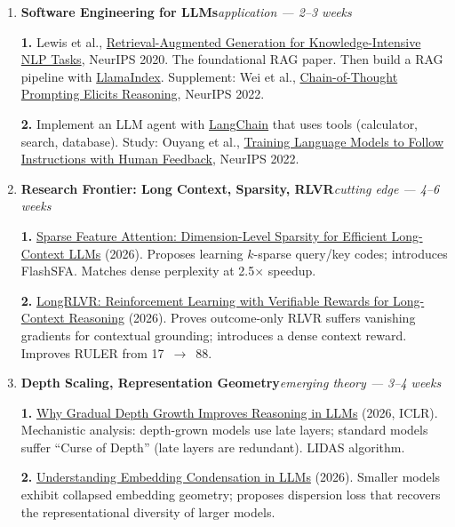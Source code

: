 \documentclass[11pt,a4paper]{article}
\begin{document}
\begin{enumerate}[leftmargin=2em,label=\textbf{Step \arabic*:},itemsep=0.7cm]
	\item \textbf{Software Engineering for LLMs}\hfill\textit{application --- 2--3 weeks}

	      \textbf{1.} Lewis et al., \href{https://arxiv.org/abs/2005.11401}{Retrieval-Augmented Generation for Knowledge-Intensive NLP Tasks}, NeurIPS 2020.
	      \newline \qquad The foundational RAG paper. Then build a RAG pipeline with \href{https://docs.llamaindex.ai/}{LlamaIndex}.
	      \newline \qquad Supplement: Wei et al., \href{https://arxiv.org/abs/2201.11903}{Chain-of-Thought Prompting Elicits Reasoning}, NeurIPS 2022.

	      \textbf{2.} Implement an LLM agent with \href{https://python.langchain.com/}{LangChain} that uses tools (calculator, search, database).
	      \newline \qquad Study: Ouyang et al., \href{https://arxiv.org/abs/2203.02155}{Training Language Models to Follow Instructions with Human Feedback}, NeurIPS 2022.

	\item \textbf{Research Frontier: Long Context, Sparsity, RLVR}\hfill\textit{cutting edge --- 4--6 weeks}

	      \textbf{1.} \href{https://arxiv.org/abs/2603.22300}{Sparse Feature Attention: Dimension-Level Sparsity for Efficient Long-Context LLMs} (2026).
	      \newline \qquad Proposes learning $k$-sparse query/key codes; introduces FlashSFA. Matches dense perplexity at 2.5$\times$ speedup.

	      \textbf{2.} \href{https://arxiv.org/abs/2603.02146}{LongRLVR: Reinforcement Learning with Verifiable Rewards for Long-Context Reasoning} (2026).
	      \newline \qquad Proves outcome-only RLVR suffers vanishing gradients for contextual grounding; introduces a dense context reward. Improves RULER from 17~$\to$~88.

	\item \textbf{Depth Scaling, Representation Geometry}\hfill\textit{emerging theory --- 3--4 weeks}

	      \textbf{1.} \href{https://openreview.net/pdf?id=UIQCQOQStf}{Why Gradual Depth Growth Improves Reasoning in LLMs} (2026, ICLR).
	      \newline \qquad Mechanistic analysis: depth-grown models use late layers; standard models suffer ``Curse of Depth'' (late layers are redundant). LIDAS algorithm.

	      \textbf{2.} \href{https://arxiv.org/pdf/2602.00217}{Understanding Embedding Condensation in LLMs} (2026).
	      \newline \qquad Smaller models exhibit collapsed embedding geometry; proposes dispersion loss that recovers the representational diversity of larger models.

\end{enumerate}
\end{document}
